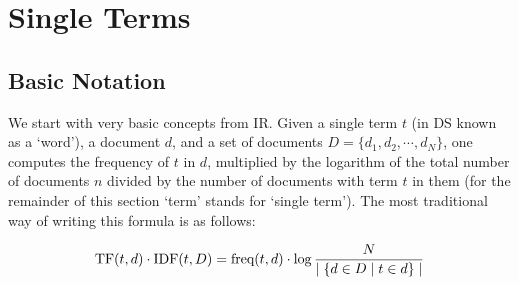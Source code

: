 




\section{Single Terms}

\subsection{Basic Notation}
We start with very basic concepts from IR.  Given a  single term $t$ (in DS known as a `word'),  a document $d$, and a set of documents $D = \{d_1, d_2, \cdots, d_N\}$,  one computes  the frequency  of   $t$  in $d$, multiplied by  the logarithm of the  total number of documents $n$ divided by the number of documents with  term $t$ in them (for the remainder of this section `term' stands for `single term'). The most traditional way of writing this formula is as  follows:

\begin{equation}
\label{tf-idf}
\textmd{TF}(t,d) \cdot \textmd{IDF}(t, D) = \textmd{freq}(t, d) \cdot \log{{N} \over {\mid \{d \in D \mid t \in d\}\mid}}
\end{equation}


